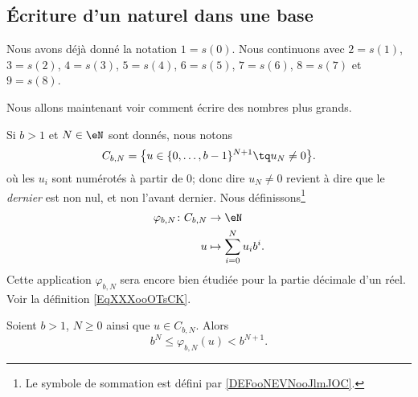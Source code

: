 \subsection{Écriture d'un naturel dans une base}

\begin{normaltext}
	Nous avons déjà donné la notation \( 1=s(0)\). Nous continuons avec \( 2=s(1)\), \( 3=s(2)\), \( 4=s(3)\), \( 5=s(4)\), \( 6=s(5)\), \( 7=s(6)\), \( 8=s(7)\) et \( 9=s(8)\).

	Nous allons maintenant voir comment écrire des nombres plus grands.
\end{normaltext}

Si \( b>1\) et \( N\in \eN\) sont donnés, nous notons
\begin{equation}
	C_{b,N}=\big\{  u\in \{ 0,\ldots, b-1 \}^{N+1}\tq u_N\neq 0  \big\}.
\end{equation}
où les \( u_i\) sont numérotés à partir de \( 0\); donc dire \( u_N\neq 0\) revient à dire que le \emph{dernier} est non nul, et non l'avant dernier. Nous définissons\footnote{Le symbole de sommation est défini par \ref{DEFooNEVNooJlmJOC}.}
\begin{equation}        \label{EQooWWTUooHAnSEv}
	\begin{aligned}
		\varphi_{b,N}\colon C_{b,N} & \to \eN                     \\
		u                           & \mapsto \sum_{i=0}^Nu_ib^i.
	\end{aligned}
\end{equation}
Cette application \( \varphi_{b,N}\) sera encore bien étudiée pour la partie décimale d'un réel. Voir la définition \ref{EqXXXooOTsCK}.

\begin{lemma}       \label{LEMooJUGKooGsbrhi}
	Soient \( b>1\), \( N\geq 0\) ainsi que \( u\in C_{b,N}\). Alors
	\begin{equation}        \label{EQooYHTLooNwqIIq}
		b^N\leq \varphi_{b,N}(u)<b^{N+1}.
	\end{equation}
\end{lemma}

